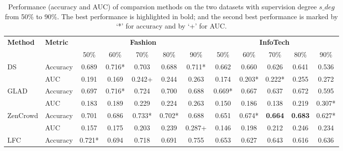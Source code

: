 \begin{table*}[t]
\centering
\caption{Performance (accuracy and AUC) of comparsion methods on the two datasets with supervision degree $s\_deg$ from 50\% to 90\%. The best performance is highlighted in bold; and the second best performance is marked by `*' for accuracy and by `+' for AUC.}\label{tab:comparision} 
\begin{tabular}{ll|ccccc|ccccc}
\toprule
\multirow{2}{*}{\textbf{Method}}  &   \multirow{2}{*}{\textbf{Metric}}  & \multicolumn{5}{|c|}{\textbf{Fashion}}      & \multicolumn{5}{c}{\textbf{InfoTech}} \jie{to update} \\ \cline{3-12}
 & &   50\%           & 60\%           & 70\%           & 80\%           & 90\%           & 50\%           & 60\%           & 70\%           & 80\%           & 90\%           \\ \midrule
\multirow{2}{*}{DS}          & Accuracy     & 0.689          & 0.716*         & 0.703          & 0.688          & 0.711*         & 0.662          & 0.660          & 0.626          & 0.641          & 0.536          \\ %
                             & AUC   & 0.191          & 0.169          & 0.242+          & 0.244          & 0.263          & 0.174          & 0.203*         & 0.222*         & 0.255          & 0.272          \\ \hline
\multirow{2}{*}{GLAD}        & Accuracy     & 0.697          & 0.716*         & 0.724          & 0.700          & 0.688          & 0.669*         & 0.667          & 0.637          & 0.672          & 0.595          \\ %
                             & AUC   & 0.183          & 0.189          & 0.229          & 0.224          & 0.263          & 0.150          & 0.186          & 0.138          & 0.219          & 0.307*         \\ \hline
ZenCrowd                           & Accuracy     & 0.701          & 0.686          & 0.733* & 0.702*         & 0.688          & 0.651          & 0.674*         & \textbf{0.664} & \textbf{0.683} & 0.627*         \\ %
                             & AUC   & 0.157          & 0.175          & 0.203         & 0.239          & 0.287+         & 0.146          & 0.198          & 0.212          & 0.246          & 0.234          \\ \hline
\multirow{2}{*}{LFC}         & Accuracy     & 0.721*         & 0.694          & 0.718          & 0.691          & 0.755          & 0.653          & 0.627          & 0.643          & 0.616          & 0.636          \\ %

\end{tabular}
\end{table*}
